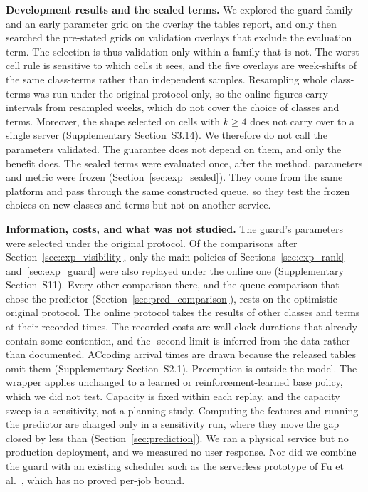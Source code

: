 \textbf{Development results and the sealed terms.} We explored the guard family and an
early parameter grid on the overlay the tables report, and only then searched the
pre-stated grids on validation overlays that exclude the evaluation term. The selection is
thus validation-only within a family that is not. The worst-cell rule is sensitive to which
cells it sees, and the five overlays are week-shifts of the same class-terms rather than
independent samples. Resampling whole class-terms was run under the original protocol only,
so the online figures carry intervals from resampled weeks, which do not cover the choice of
classes and terms. Moreover, the shape selected on  cells with $k \ge 4$ does
not carry over to a single server (Supplementary Section~S3.14). We therefore do not call
the parameters validated. The guarantee does not depend on them, and only the benefit does.
The sealed terms were evaluated once, after the method, parameters and metric were frozen
(Section~\ref{sec:exp_sealed}). They come from the same platform and pass through the same
constructed queue, so they test the frozen choices on new classes and terms but not on
another service.

\textbf{Information, costs, and what was not studied.} The guard's parameters were selected
under the original protocol. Of the comparisons after Section~\ref{sec:exp_visibility}, only
the  main policies of Sections~\ref{sec:exp_rank} and~\ref{sec:exp_guard} were
also replayed under the online one (Supplementary Section~S11). Every other comparison there,
and the queue comparison that chose the predictor (Section~\ref{sec:pred_comparison}), rests
on the optimistic original protocol. The online protocol
takes the results of other classes and terms at their recorded times. The recorded costs are wall-clock durations that already
contain some contention, and the -second limit is inferred from the data rather
than documented. ACcoding arrival times are drawn because the released tables omit them
(Supplementary Section~S2.1). Preemption is outside the model. The wrapper applies
unchanged to a learned or reinforcement-learned base policy, which we did not test.
Capacity is fixed within each replay, and the capacity sweep is a sensitivity, not a
planning study. Computing the features and running the predictor are charged only in a
sensitivity run, where they move the gap closed by less than 
(Section~\ref{sec:prediction}). We ran a physical service but no production deployment, and
we measured no user response. Nor did we combine the guard with an existing scheduler such
as the serverless prototype of Fu et al.\ \cite{fu2024alps}, which has no proved per-job
bound.

